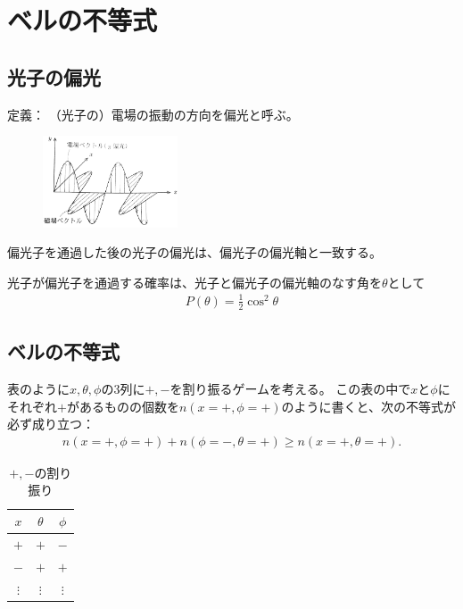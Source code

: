 \documentclass[10pt,b5paper,papersize,dvipdfmx]{jsbook}
\begin{document}
\fi
\ifsecII
\section{ベルの不等式}

%
\subsection{光子の偏光} %

定義：
（光子の）電場の振動の方向を偏光と呼ぶ。

\begin{figure}[ht]
  \centering
  \includegraphics[width=40mm]{nkym/fig/henkou.jpeg}
\end{figure}

偏光子を通過した後の光子の偏光は、偏光子の偏光軸と一致する。

光子が偏光子を通過する確率は、光子と偏光子の偏光軸のなす角を$\theta$として
\begin{align*}
  P(\theta) = \frac12 \cos^2\theta
\end{align*}

%
\subsection{ベルの不等式} %

表のように$x, \theta, \phi$の3列に$+, -$を割り振るゲームを考える。
この表の中で$x$と$\phi$にそれぞれ$+$があるものの個数を$n(x=+,\phi=+)$のように書くと、次の不等式が必ず成り立つ：
\begin{align*}
  n(x=+,\phi=+) + n(\phi=-,\theta=+) \ge n(x=+,\theta=+).
\end{align*}

\begin{table}[htbp]
  \centering
  \caption{$+, -$の割り振り}
  \begin{tabular}{ccc} \hline
    $x$ & $\theta$ & $\phi$ \\ \hline
    $+$ & $+$ & $-$ \\
    $-$ & $+$ & $+$ \\
    $\vdots$ & $\vdots$ & $\vdots$ \\ \hline
  \end{tabular}
\end{table}
\end{document}
